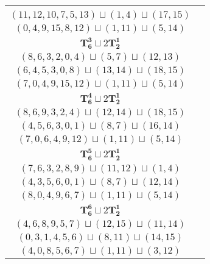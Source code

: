 \documentclass{article}
\begin{document}
\begin{longtable}{|c|c|}
\begin{tabular}{c}
        $(13,10,9,7,4,11)\sqcup(8,6)\sqcup(12,15)$ \\ 
        $(11,12,10,7,5,13)\sqcup(1,4)\sqcup(17,15)$ \\ 
        $(0,4,9,15,8,12)\sqcup(1,11)\sqcup(5,14)$
        \end{tabular} \\ 
        \hline
        $\mathbf{T_{6}^{3}} \sqcup 2\mathbf{T_{2}^{1}}$ & \begin{tabular}{c}
        $(0,1,2,4,7,5)\sqcup(9,6)\sqcup(8,10)$ \\ 
        $(8,6,3,2,0,4)\sqcup(5,7)\sqcup(12,13)$ \\ 
        $(6,4,5,3,0,8)\sqcup(13,14)\sqcup(18,15)$ \\ 
        $(7,0,4,9,15,12)\sqcup(1,11)\sqcup(5,14)$
        \end{tabular} \\ 
        \hline
        $\mathbf{T_{6}^{4}} \sqcup 2\mathbf{T_{2}^{1}}$ & \begin{tabular}{c}
        $(1,2,5,4,6,7)\sqcup(13,14)\sqcup(12,15)$ \\ 
        $(8,6,9,3,2,4)\sqcup(12,14)\sqcup(18,15)$ \\ 
        $(4,5,6,3,0,1)\sqcup(8,7)\sqcup(16,14)$ \\ 
        $(7,0,6,4,9,12)\sqcup(1,11)\sqcup(5,14)$
        \end{tabular} \\ 
        \hline
        $\mathbf{T_{6}^{5}} \sqcup 2\mathbf{T_{2}^{1}}$ & \begin{tabular}{c}
        $(0,2,4,7,1,5)\sqcup(11,13)\sqcup(12,15)$ \\ 
        $(7,6,3,2,8,9)\sqcup(11,12)\sqcup(1,4)$ \\ 
        $(4,3,5,6,0,1)\sqcup(8,7)\sqcup(12,14)$ \\ 
        $(8,0,4,9,6,7)\sqcup(1,11)\sqcup(5,14)$
        \end{tabular} \\ 
        \hline
        $\mathbf{T_{6}^{6}} \sqcup 2\mathbf{T_{2}^{1}}$ & \begin{tabular}{c}
        $(0,2,1,3,4,5)\sqcup(12,14)\sqcup(18,19)$ \\ 
        $(4,6,8,9,5,7)\sqcup(12,15)\sqcup(11,14)$ \\ 
        $(0,3,1,4,5,6)\sqcup(8,11)\sqcup(14,15)$ \\ 
        $(4,0,8,5,6,7)\sqcup(1,11)\sqcup(3,12)$
        \end{tabular} \\ 

\end{longtable}
\end{document}
